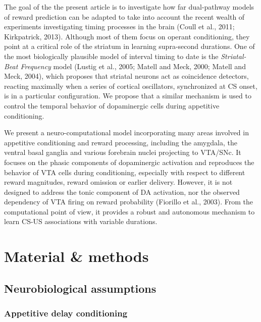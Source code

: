 \documentclass[
  11pt,
  a4paper,
]{scrbook}
\begin{document}
The goal of the the present article is to investigate how far
dual-pathway models of reward prediction can be adapted to take into
account the recent wealth of experiments investigating timing processes
in the brain (Coull et al., 2011; Kirkpatrick, 2013). Although most of
them focus on operant conditioning, they point at a critical role of the
striatum in learning supra-second durations. One of the most
biologically plausible model of interval timing to date is the
\emph{Striatal-Beat Frequency} model (Lustig et al., 2005; Matell and
Meck, 2000; Matell and Meck, 2004), which proposes that striatal neurons
act as coincidence detectors, reacting maximally when a series of
cortical oscillators, synchronized at CS onset, is in a particular
configuration. We propose that a similar mechanism is used to control
the temporal behavior of dopaminergic cells during appetitive
conditioning.

We present a neuro-computational model incorporating many areas involved
in appetitive conditioning and reward processing, including the
amygdala, the ventral basal ganglia and various forebrain nuclei
projecting to VTA/SNc. It focuses on the phasic components of
dopaminergic activation and reproduces the behavior of VTA cells during
conditioning, especially with respect to different reward magnitudes,
reward omission or earlier delivery. However, it is not designed to
address the tonic component of DA activation, nor the observed
dependency of VTA firing on reward probability (Fiorillo et al., 2003).
From the computational point of view, it provides a robust and
autonomous mechanism to learn CS-US associations with variable
durations.

\section{Material \& methods}\label{material-methods}

\subsection{Neurobiological
assumptions}\label{neurobiological-assumptions}

\subsubsection*{Appetitive delay
conditioning}\label{appetitive-delay-conditioning}
\end{document}
